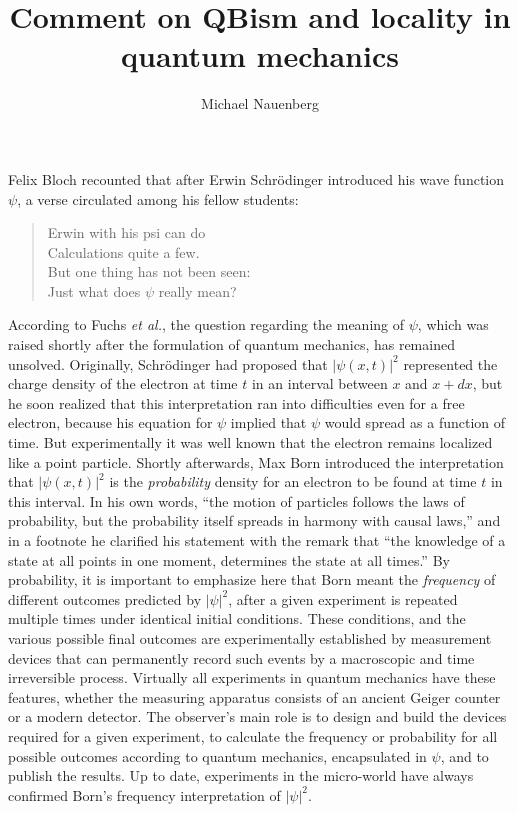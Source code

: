 \documentclass[prb,preprint]{revtex4-1}
\begin{document}
\title{Comment  on  QBism and locality in quantum mechanics}
\author{Michael Nauenberg}



\maketitle

Felix Bloch recounted  that after Erwin Schr\"{o}dinger introduced his  wave function $\psi$,  
a verse circulated among his fellow students:
\begin{quote}
Erwin with his psi can do\\
Calculations quite a few.\\
But one thing has not been seen:\\
Just what does $\psi$ really mean? \cite{bloch}
\end{quote} 

According to Fuchs {\it et al.},\cite{mermin} the question regarding the meaning of $\psi$, which was raised shortly after the formulation of quantum mechanics, has remained unsolved.  Originally, Schr\"{o}dinger  had  proposed that $|\psi(x,t)|^2$ represented the charge density  of the electron at  time $t$ in an interval between $x$ and $x+dx$, but he soon realized that this interpretation  ran into difficulties even for a free electron, because his equation for $\psi$ implied that $\psi$ would   spread as a function of time.\cite{sch}  But experimentally it was well known that the electron remains localized like a point particle. Shortly afterwards,  Max Born introduced the interpretation that  $|\psi (x,t) |^2$ is  the {\it probability} density  for an electron to be found at time $t$ in this interval.\cite{born, born2}  In his own words, ``the motion of particles follows  the laws of probability,  but the probability itself spreads in harmony with causal laws,'' and in a footnote he clarified his statement with the remark that ``the knowledge of a state at all points in one moment, determines the state at all times.''\cite{born2}  By probability, it  is important  to emphasize here that Born meant  the {\it frequency} of different  outcomes predicted by $|\psi|^2$,  after a given experiment is repeated multiple times under identical  initial conditions.  These  conditions,  and the various possible final outcomes are experimentally established by measurement devices that can permanently record such events by a macroscopic and time irreversible process.  Virtually all experiments in quantum mechanics have these features, whether the measuring apparatus consists of an ancient Geiger counter or a modern detector.  The observer's main role  is to design and build the devices required for a given experiment,  to calculate the frequency or  probability for all possible outcomes according to quantum mechanics, encapsulated in $\psi$, and to publish the results.  Up to date,  experiments in the micro-world  have always confirmed Born's frequency interpretation of $|\psi|^2$. 
\end{document}
